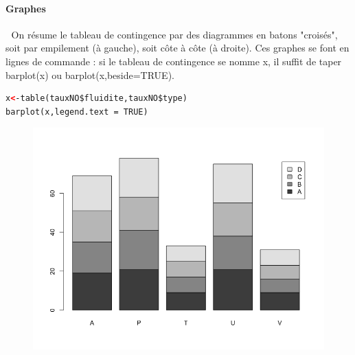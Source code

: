 \paragraph{Graphes}\textcolor{white}{.}\newline
On résume le tableau de contingence par des diagrammes en batons "croisés",
soit par empilement (à gauche), soit côte à côte (à droite).\newline
Ces graphes se font en lignes de commande : si le tableau de contingence se
nomme x, il suffit de taper barplot(x) ou barplot(x,beside=TRUE).
\begin{lstlisting}[language=html]
x<-table(tauxNO$fluidite,tauxNO$type)
barplot(x,legend.text = TRUE)
\end{lstlisting}
\begin{figure}[H]\begin{center}\includegraphics[scale=0.5]{ilu/ccm14.png}\end{center}\end{figure}

